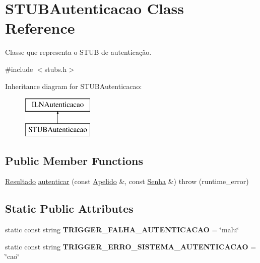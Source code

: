 \hypertarget{classSTUBAutenticacao}{}\section{S\+T\+U\+B\+Autenticacao Class Reference}
\label{classSTUBAutenticacao}


Classe que representa o S\+T\+UB de autenticação.  




{\ttfamily \#include $<$stubs.\+h$>$}

Inheritance diagram for S\+T\+U\+B\+Autenticacao\+:\begin{figure}[H]
\begin{center}
\leavevmode
\includegraphics[height=2.000000cm]{classSTUBAutenticacao}
\end{center}
\end{figure}
\subsection*{Public Member Functions}
\begin{DoxyCompactItemize}
\item 
\hyperlink{classResultado}{Resultado} \hyperlink{classSTUBAutenticacao_a4b86dce88ab27b7b8d3fda491690bb18}{autenticar} (const \hyperlink{classApelido}{Apelido} \&, const \hyperlink{classSenha}{Senha} \&)  throw (runtime\+\_\+error)
\end{DoxyCompactItemize}
\subsection*{Static Public Attributes}
\begin{DoxyCompactItemize}
\item 
\mbox{\label{classSTUBAutenticacao_a1ef623ead776d172cdcf868ceeb54cdf}} 
static const string {\bfseries T\+R\+I\+G\+G\+E\+R\+\_\+\+F\+A\+L\+H\+A\+\_\+\+A\+U\+T\+E\+N\+T\+I\+C\+A\+C\+AO} = \char`\"{}malu\char`\"{}
\item 
\mbox{\label{classSTUBAutenticacao_a7c598d8ac99b7dfc652bd2c7c617d29f}} 
static const string {\bfseries T\+R\+I\+G\+G\+E\+R\+\_\+\+E\+R\+R\+O\+\_\+\+S\+I\+S\+T\+E\+M\+A\+\_\+\+A\+U\+T\+E\+N\+T\+I\+C\+A\+C\+AO} = \char`\"{}cao\char`\"{}
\end{DoxyCompactItemize}


